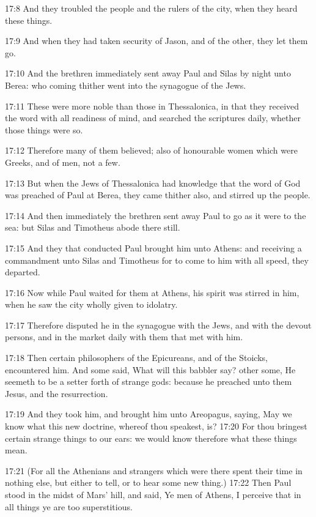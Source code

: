 17:8 And they troubled the people and the rulers of the city, when
they heard these things.

17:9 And when they had taken security of Jason, and of the other, they
let them go.

17:10 And the brethren immediately sent away Paul and Silas by night
unto Berea: who coming thither went into the synagogue of the Jews.

17:11 These were more noble than those in Thessalonica, in that they
received the word with all readiness of mind, and searched the
scriptures daily, whether those things were so.

17:12 Therefore many of them believed; also of honourable women which
were Greeks, and of men, not a few.

17:13 But when the Jews of Thessalonica had knowledge that the word of
God was preached of Paul at Berea, they came thither also, and stirred
up the people.

17:14 And then immediately the brethren sent away Paul to go as it
were to the sea: but Silas and Timotheus abode there still.

17:15 And they that conducted Paul brought him unto Athens: and
receiving a commandment unto Silas and Timotheus for to come to him
with all speed, they departed.

17:16 Now while Paul waited for them at Athens, his spirit was stirred
in him, when he saw the city wholly given to idolatry.

17:17 Therefore disputed he in the synagogue with the Jews, and with
the devout persons, and in the market daily with them that met with
him.

17:18 Then certain philosophers of the Epicureans, and of the Stoicks,
encountered him. And some said, What will this babbler say? other
some, He seemeth to be a setter forth of strange gods: because he
preached unto them Jesus, and the resurrection.

17:19 And they took him, and brought him unto Areopagus, saying, May
we know what this new doctrine, whereof thou speakest, is?  17:20 For
thou bringest certain strange things to our ears: we would know
therefore what these things mean.

17:21 (For all the Athenians and strangers which were there spent
their time in nothing else, but either to tell, or to hear some new
thing.)  17:22 Then Paul stood in the midst of Mars' hill, and said,
Ye men of Athens, I perceive that in all things ye are too
superstitious.

